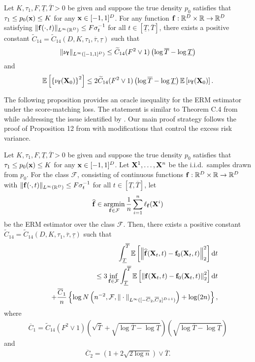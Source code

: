 \documentclass[twoside,11pt]{article}
\def\cF{\mathcal F}
\newcommand{\bff}{{\bf f}}
\newcommand{\bx}{{\bf x}}
\newcommand{\bX}{{\bf X}}
\newcommand{\bbE}{{\mathbb E}}
\newcommand{\bbR}{{\mathbb R}}
\newcommand{\iid}{{\rm i.i.d.}}
\newcommand{\bean}{\setlength\arraycolsep{1pt}\begin{eqnarray*}}
\newcommand{\eean}{\end{eqnarray*}}
\DeclareMathOperator*{\argmin}{argmin}
\def\d{{\rm d}}
\begin{document}
\begin{lemma}
\label{sec:exbd}
Let $K, \tau_1, F, \underline{T}, \overline{T} > 0$ be given and suppose the true density $p_0$ satisfies that $\tau_1 \leq p_0(\bx) \leq K$ for any $\bx \in [-1,1]^{D}$.
For any function $\bff : \bbR^{D} \times \bbR \rightarrow \bbR^{D}$ satisfying
$
\| \bff(\cdot, t) \|_{L^{\infty}(\bbR^{D})} \leq F \sigma_{t}^{-1}
$ for all $t \in [\underline{T}, \overline{T}]$, there exists a positive constant $\widetilde C_{14} = \widetilde C_{14} (D, K, \tau_1, \overline{\tau}, \underline{\tau})$ such that
\bean
\| \nu_{\bff} \|_{L^{\infty}([-1,1]^{D})} \leq \widetilde C_{14}  (F^2 \vee 1)  \left( \log \overline{T} - \log \underline{T} \right)
\eean
and
\bean
\bbE \left[ \left\{ \nu_{\bff}(\bX_0)\right\}^2 \right] \leq 2 \widetilde C_{14}  (F^2 \vee 1) \left( \log \overline{T} - \log \underline{T} \right) \bbE \left[ \nu_{\bff}(\bX_0) \right].
\eean
\end{lemma}

The following proposition provides an oracle inequality for the ERM estimator under the score-matching loss.
The statement is similar to Theorem C.4 from \citet{oko2023diffusion} while addressing the issue identified by \citet{yakovlev2025generalization}.
Our main proof strategy follows the proof of Proposition 12 from \cite{stephanovitch2025generalization} with modifications that control the excess risk variance.

\begin{proposition}
\label{sec:oracle}
Let $K, \tau_1, F, \underline{T}, \overline{T} > 0$ be given and suppose the true density $p_0$ satisfies that $\tau_1 \leq p_0(\bx) \leq K$ for any $\bx \in [-1,1]^{D}$.
Let $\bX^1,\ldots,\bX^n$ be the \iid \ samples drawn from $p_0$. 
For the class $\cF$, consisting of continuous functions $\bff : \bbR^{D} \times \bbR \to \bbR^{D}$ with $\| \bff(\cdot,t)\|_{L^{\infty}(\bbR^{D})} \leq F \sigma_{t}^{-1}$ for all $t \in [\underline{T}, \overline{T}]$, let 
\bean
\widehat \bff \in \argmin_{\bff \in \cF} \frac{1}{n} \sum_{i=1}^{n} \ell_{\bff}(\bX^i)
\eean
be the ERM estimator over the class $\cF$.
Then, there exists a positive constant $\widetilde C_{14} = \widetilde C_{14} (D,K,\tau_1,\overline{\tau},\underline{\tau})$ such that
\bean
&& \int_{\underline{T}}^{\overline{T}} \bbE \left[ \left\| \widehat \bff(\bX_t,t) - \bff_0(\bX_t,t) \right\|_2^2 \right] \d t
\\
&& \leq 3 \inf_{\bff \in \cF} \int_{\underline{T}}^{\overline{T}} \bbE \left[ \left\|  \bff(\bX_t,t) - \bff_0(\bX_t,t) \right\|_2^2 \right] \d t
\\
&& \quad + \frac{\overline{C}_1}{n} \left\{ \log N \left( n^{-2}, \cF, \| \cdot\|_{L^{\infty} ([-\overline{C}_2,\overline{C}_2]^{D+1})} \right) + \log (2n) \right\},
\eean
where 
\bean
\overline{C}_1 = \widetilde C_{14} (F^2 \vee 1)  \left( \sqrt{\overline{T}} + \sqrt{\log \overline{T} - \log \underline{T}} \right) \left( \sqrt{\log \overline{T} - \log \underline{T}} \right)
\eean
and
\bean
\overline{C}_2 = \left( 1 + 2\sqrt{2 \log n}  \right) \vee \overline{T}.
\eean
\end{proposition}
\end{document}

